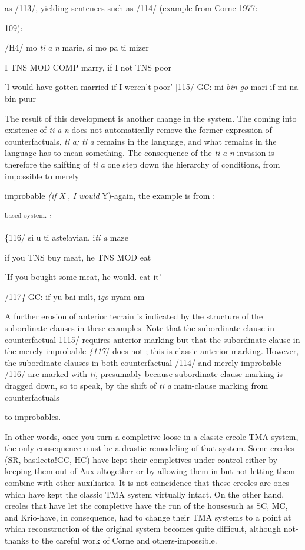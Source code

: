 as /113/, yielding sentences such as /114/ (example from Corne 1977:

109):

/H4/ mo \textit{ti} \textit{a} \textit{n} marie, si mo pa ti mizer

I TNS MOD COMP marry, if I not TNS poor

'l would have gotten married if I weren't poor' [115/ GC: mi \textit{bin} \textit{go} mari if mi na bin puur

The result of this development is another change in the system. The coming into existence of \textit{ti} \textit{a} \textit{n} does not automatically remove the former expression of counterfactuals, \textit{ti} \textit{a;} \textit{ti} \textit{a} remains in the lan\-guage, and what remains in the language has to mean something. The consequence of the \textit{ti} \textit{a} \textit{n} invasion is therefore the shifting of \textit{ti} \textit{a} one step down the hierarchy of conditions, from impossible to merely

improbable \textit{(}\textit{i}\textit{f} \textit{X} , \textit{I} \textit{would} Y){}-again, the example is from \citet[106]{Corne1977}:

\textsuperscript{based} \textsuperscript{system. }'


\{116/ si u ti aste!avian, i\textit{ti} \textit{a }maze

if you TNS buy meat, he TNS MOD eat

'If you bought some meat, he would. eat it'

/117\textit{\{ }GC: if yu bai milt, i\textit{go} nyam am

A further erosion of anterior terrain is indicated by the structure of the subordinate clauses in these examples. Note that the subordinate clause in counterfactual 1115/ requires anterior marking but that the subordinate clause in the merely improbable \textit{\{117}/ does not ; this is classic anterior marking. However, the subordinate clauses in both counterfactual /114/ and merely improbable /116/ are marked with \textit{ti,} presumably because subordinate clause marking is dragged down, so to speak, by the shift of \textit{ti} \textit{a }main-clause marking from counterfactuals

to improbables.

In other words, once you turn a completive loose in a classic creole TMA system, the only consequence must be a drastic remodeling of that system. Some creoles (SR, basilecta!GC, HC) have kept their completives under control either by keeping them out of Aux al\-together or by allowing them in but not letting them combine with other auxiliaries. It is not coincidence that these creoles are ones which have kept the classic TMA system virtually intact. On the other hand, creoles that have let the completive have the run of the house\-such as SC, MC, and Krio-have, in consequence, had to change their TMA systems to a point at which reconstruction of the original system becomes quite difficult, although not-thanks to the careful work of Corne and others-impossible.

